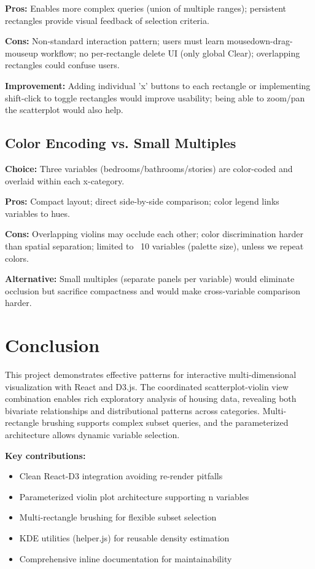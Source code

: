 \documentclass[sigplan,screen]{acmart}
\begin{document}
\textbf{Pros:} Enables more complex queries (union of multiple ranges);
persistent rectangles provide visual feedback of selection criteria.

\textbf{Cons:} Non-standard interaction pattern; users must learn
mousedown-drag-mouseup workflow; no per-rectangle delete UI (only
global Clear); overlapping rectangles could confuse users.

\textbf{Improvement:} Adding individual 'x' buttons to each rectangle
or implementing shift-click to toggle rectangles would improve
usability; being able to zoom/pan the scatterplot would also help.

\subsection{Color Encoding vs. Small Multiples}

\textbf{Choice:} Three variables (bedrooms/bathrooms/stories) are
color-coded and overlaid within each x-category.

\textbf{Pros:} Compact layout; direct side-by-side comparison; color
legend links variables to hues.

\textbf{Cons:} Overlapping violins may occlude each other; color
discrimination harder than spatial separation; limited to ~10 variables
(palette size), unless we repeat colors.

\textbf{Alternative:} Small multiples (separate panels per variable)
would eliminate occlusion but sacrifice compactness and would make
cross-variable comparison harder.

\section{Conclusion}

This project demonstrates effective patterns for interactive
multi-dimensional visualization with React and D3.js. The coordinated
scatterplot-violin view combination enables rich exploratory analysis
of housing data, revealing both bivariate relationships and
distributional patterns across categories. Multi-rectangle brushing
supports complex subset queries, and the parameterized architecture
allows dynamic variable selection.

\textbf{Key contributions:}
\begin{itemize}
\item Clean React-D3 integration avoiding re-render pitfalls
\item Parameterized violin plot architecture supporting n variables
\item Multi-rectangle brushing for flexible subset selection
\item KDE utilities (helper.js) for reusable density estimation
\item Comprehensive inline documentation for maintainability
\end{itemize}
\end{document}
